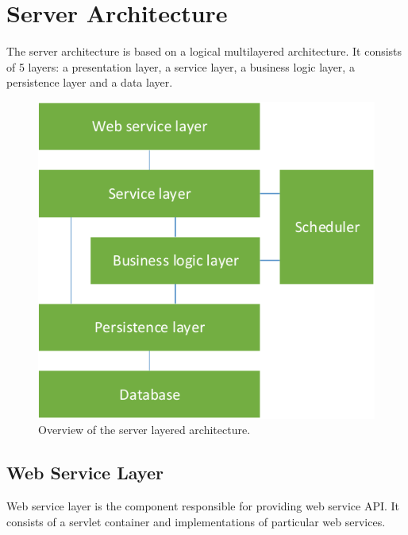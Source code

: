 

\section{Server Architecture}

The server architecture is based on a logical multilayered architecture. It
consists of 5 layers: a presentation layer, a service layer, a business logic layer, 
a persistence layer and a data layer.



\begin{figure}[!htb]
        \centering
        \includegraphics{Images/ServerComponentOverview}
        \caption{Overview of the server layered architecture.}
        \label{fig:ServerComponentOverview}
\end{figure}

\subsection{Web Service Layer}
Web service layer is the component responsible for providing web service
API. It consists of a servlet container and implementations of particular
web services.

